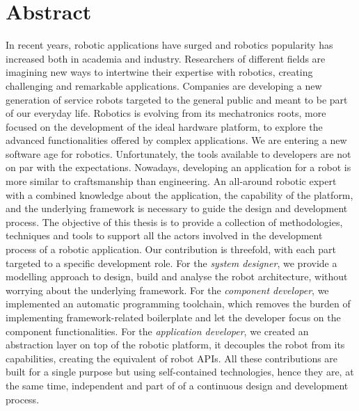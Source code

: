 \begingroup
\let\clearpage\relax
\let\cleardoublepage\relax
\let\cleardoublepage\relax

\chapter*{Abstract}
In recent years, robotic applications have surged and robotics popularity has increased both in academia and industry. Researchers of different fields are imagining new ways to intertwine their expertise with robotics, creating challenging and remarkable applications. Companies are developing a new generation of service robots targeted to the general public and meant to be part of our everyday life. Robotics is evolving from its mechatronics roots, more focused on the development of the ideal hardware platform, to explore the advanced functionalities offered by complex applications. We are entering a new software age for robotics. Unfortunately, the tools available to developers are not on par with the expectations. Nowadays, developing an application for a robot is more similar to craftsmanship than engineering. An all-around robotic expert with a combined knowledge about the application, the capability of the platform, and the underlying framework is necessary to guide the design and development process. The objective of this thesis is to provide a collection of methodologies, techniques and tools to support all the actors involved in the development process of a robotic application. Our contribution is threefold, with each part targeted to a specific development role. For the \textit{system designer}, we provide a modelling approach to design, build and analyse the robot architecture, without worrying about the underlying framework. For the \textit{component developer}, we implemented an automatic programming toolchain, which removes the burden of implementing framework-related boilerplate and let the developer focus on the component functionalities. For the \textit{application developer}, we created an abstraction layer on top of the robotic platform, it decouples the robot from its capabilities, creating the equivalent of robot APIs. All these contributions are built for a single purpose but using self-contained technologies, hence they are, at the same time, independent and part of of a continuous design and development process.





\endgroup

\vfill
